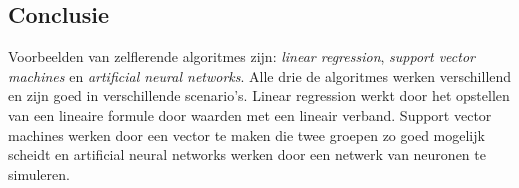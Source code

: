 \subsection{Conclusie}
Voorbeelden van zelflerende algoritmes zijn: \textit{linear regression}, \textit{support vector machines} en \textit{artificial neural networks}. Alle drie de algoritmes werken verschillend en zijn goed in verschillende scenario's. Linear regression werkt door het opstellen van een lineaire formule door waarden met een lineair verband. Support vector machines werken door een vector te maken die twee groepen zo goed mogelijk scheidt en artificial neural networks werken door een netwerk van neuronen te simuleren.
